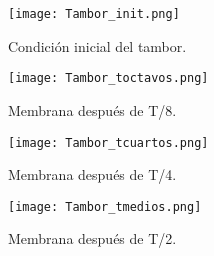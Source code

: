\documentclass[a4paper,10pt]{article}
\begin{document}
\begin{figure}[H]
    \centering
    \texttt{[image: Tambor\_init.png]}
    \caption{Condición inicial del tambor.}
\end{figure}

\begin{figure}[H]
    \centering
    \texttt{[image: Tambor\_toctavos.png]}
    \caption{Membrana después de T/8.}
\end{figure}

\begin{figure}[H]
    \centering
    \texttt{[image: Tambor\_tcuartos.png]}
    \caption{Membrana después de T/4.}
\end{figure}

\begin{figure}[H]
    \centering
    \texttt{[image: Tambor\_tmedios.png]}
    \caption{Membrana después de T/2.}
\end{figure}
\end{document}
